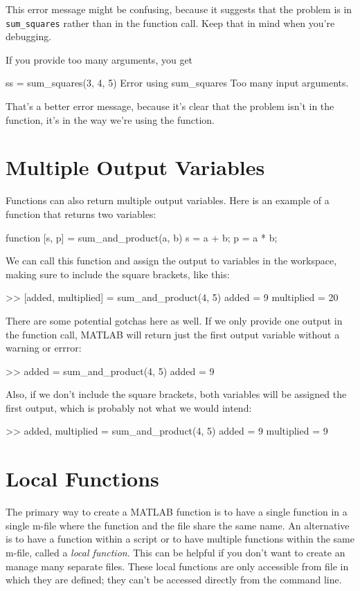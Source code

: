 This error message might be confusing, because it suggests that
the problem is in \lstinline{sum_squares} rather than in the function call.
Keep that in mind when you're debugging.

If you provide too many arguments, you get

\begin{code}
ss = sum_squares(3, 4, 5)
Error using sum_squares
Too many input arguments.
\end{code}

That's a better error message, because it's clear that the problem isn't in the function, it's in the way we're using the function.

\section{Multiple Output Variables}

Functions can also return multiple output variables.  Here is an example of a function that returns two variables:
\begin{code}
function [s, p] = sum_and_product(a, b) 
    s = a + b;
    p = a * b;
\end{code}

We can call this function and assign the output to variables in the workspace, making sure to include the square brackets, like this:
\begin{code}
    >> [added, multiplied] = sum_and_product(4, 5)
    added =
         9
    multiplied =
        20
\end{code}

There are some potential gotchas here as well.  If we only provide one output in the function call, MATLAB will return just the first output variable without a warning or errror:
\begin{code}
    >> added = sum_and_product(4, 5)
    added =
         9    
\end{code}
Also, if we don't include the square brackets, both variables will be assigned the first output, which is probably not what we would intend:
\begin{code}
    >> added, multiplied = sum_and_product(4, 5)
    added =
         9
    multiplied =
         9
\end{code}

\section{Local Functions}
The primary way to create a MATLAB function is to have a single function in a single m-file where the function and the file share the same name.  An alternative is to have a function within a script or to have multiple functions within the same m-file, called a \emph{local function}.   This can be helpful if you don't want to create an manage many separate files. These local functions are only accessible from file in which they are defined; they can't be accessed directly from the command line.

